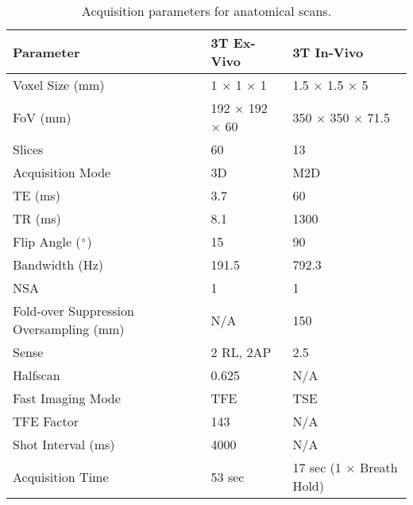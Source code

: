 \begin{table}[H]
	\centering
	\begin{tabularx}{1.0\textwidth}{X|X|X}
		\textbf{Parameter}                      & \textbf{3T Ex-Vivo} & \textbf{3T In-Vivo}      \\ \hline
		Voxel Size (mm)                         & 1 $\times$ 1 $\times$ 1           & 1.5 $\times$ 1.5 $\times$ 5            \\ \hline
		FoV (mm)                                & 192 $\times$ 192 $\times$ 60      & 350 $\times$ 350 $\times$ 71.5         \\ \hline
		Slices                                  & 60                  & 13                       \\ \hline
		Acquisition Mode                        & 3D                  & M2D                      \\ \hline
		TE (ms)                                 & 3.7                 & 60                       \\ \hline
		TR (ms)                                 & 8.1                 & 1300                     \\ \hline
		Flip Angle ($\degree$)                  & 15                  & 90                       \\ \hline
		Bandwidth (Hz)                          & 191.5               & 792.3                    \\ \hline
		NSA                                     & 1                   & 1                        \\ \hline
		Fold-over Suppression Oversampling (mm) & N/A                 & 150                      \\ \hline
		Sense                                   & 2 RL, 2AP           & 2.5                      \\ \hline
		Halfscan                                & 0.625               & N/A                      \\ \hline
		Fast Imaging Mode                       & TFE                 & TSE                      \\ \hline
		TFE Factor                              & 143                 & N/A                      \\ \hline
		Shot Interval (ms)                      & 4000                & N/A                      \\ \hline
		Acquisition Time                        & 53 sec              & 17 sec (1 $\times$ Breath Hold)
	\end{tabularx}
	\caption{Acquisition parameters for anatomical scans.}
	\label{tab:ex_anatomical}
\end{table}

